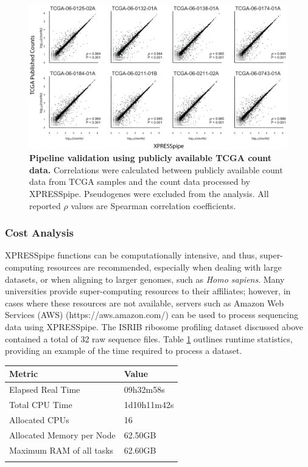 \documentclass[10pt, oneside]{article}
\begin{document}
\begin{figure}
\centering
  \includegraphics[width=180mm]{figures/xpresspipe_figure4.png}
  \caption{\textbf{Pipeline validation using publicly available TCGA count data.} Correlations were calculated between publicly available count data from TCGA samples and the count data processed by XPRESSpipe. Pseudogenes were excluded from the analysis. All reported $\rho$ values are Spearman correlation coefficients.}
  \label{fig:figure4}
\end{figure}


\subsubsection{Cost Analysis}
XPRESSpipe functions can be computationally intensive, and thus, super-computing resources are recommended, especially when dealing with large datasets, or when aligning to larger genomes, such as \textit{Homo sapiens}. Many universities provide super-computing resources to their affiliates; however, in cases where these resources are not available, servers such as Amazon Web Services (AWS) (https://aws.amazon.com/) can be used to process sequencing data using XPRESSpipe. The ISRIB ribosome profiling dataset discussed above contained a total of 32 raw sequence files. Table \ref{tab:chpc_performance} outlines runtime statistics, providing an example of the time required to process a dataset. \par

\begin{table}[!]
    \centering
{}
\begin{tabular}{p{5cm}p{3cm}}
\textbf{Metric} & \textbf{Value} \\
\hline
 Elapsed Real Time & 09h32m58s \\
 \hline
 Total CPU Time & 1d10h11m42s \\
 \hline
 Allocated CPUs & 16 \\
 \hline
 Allocated Memory per Node & 62.50GB \\
 \hline
 Maximum RAM of all tasks & 62.60GB \\
 \label{tab:chpc_performance}
\end{tabular}
\end{table}
\end{document}
